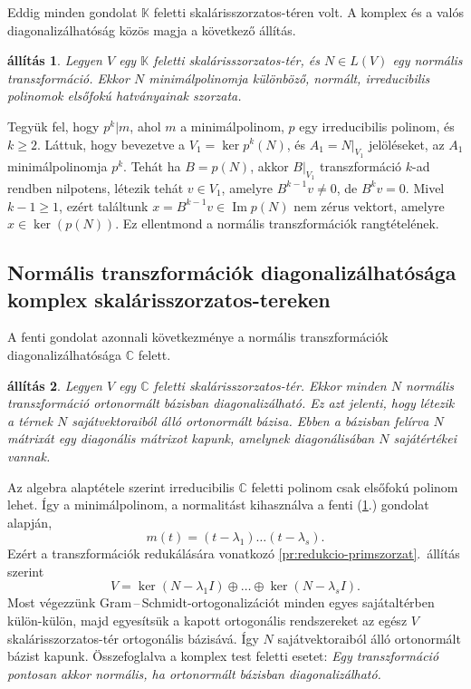 \documentclass[9pt, a4paper, showtrims]{memoir}
\makeatletter
\renewenvironment{proof}[1][\proofname]
    {\par\pushQED{\qed}%
    \normalfont \topsep6\p@\@plus6\p@\relax
    \trivlist
    \item[\hskip\labelsep
        \itshape
    #1\@addpunct{:}]\ignorespaces}
    {\popQED\endtrivlist\@endpefalse}
\theoremstyle{plain}
\newtheorem{proposition}{állítás}[chapter]
\theoremstyle{remark}
\theoremstyle{definition}
\DeclareMathOperator{\im}{Im}
\makeatother
\begin{document}
Eddig minden gondolat $\mathbb{K}$ feletti skalárisszorzatos-téren volt.
A komplex és a valós diagonalizálhatóság közös magja a következő állítás.
\begin{proposition}\label{pr:normalis-mult1}
	Legyen $V$ egy $\mathbb{K}$ feletti skalárisszorzatos-tér,
	és $N\in L\left( V \right)$ egy normális transzformáció.
	Ekkor $N$ minimálpolinomja különböző, normált, irreducibilis polinomok elsőfokú hatványainak szorzata.
\end{proposition}
\begin{proof}
	Tegyük fel, hogy $p^k|m$, ahol $m$ a minimálpolinom,
	$p$ egy irreducibilis polinom, és $k\geq 2.$
	Láttuk, hogy bevezetve a $V_1=\ker p^k\left( N \right)$, és
	$A_1=N|_{V_1}$ jelöléseket,
	az $A_1$ minimálpolinomja $p^k$.
	Tehát ha $B=p(N)$, akkor $B|_{V_1}$ transzformáció $k$-ad rendben nilpotens,
	létezik tehát $v\in V_1$,
	amelyre $B^{k-1}v\neq 0$,
	de $B^kv=0$.
	Mivel $k-1\geq 1$, ezért találtunk $x=B^{k-1}v\in\im p\left( N \right)$
	nem zérus vektort,
	amelyre $x\in\ker(p\left( N \right))$.
	Ez ellentmond a normális transzformációk rangtételének.
\end{proof}
\subsection{Normális transzformációk diagonalizálhatósága komplex skalárisszorzatos-tereken}
A fenti gondolat azonnali következménye a normális transzformációk diagonalizálhatósága $\mathbb{C}$ felett.
\begin{proposition}
	Legyen $V$ egy $\mathbb{C}$ feletti skalárisszorzatos-tér.
	Ekkor minden $N$ normális transzformáció ortonormált bázisban diagonalizálható.
	Ez azt jelenti, hogy létezik a térnek $N$ sajátvektoraiból álló ortonormált bázisa.
	Ebben a bázisban felírva $N$ mátrixát egy diagonális mátrixot kapunk,
	amelynek diagonálisában $N$ sajátértékei vannak.
\end{proposition}
\begin{proof}
	Az algebra alaptétele szerint irreducibilis $\mathbb{C}$ feletti polinom
	csak elsőfokú polinom lehet.
	Így a minimálpolinom, a normalitást kihasználva a fenti (\ref{pr:normalis-mult1}.) gondolat alapján,
	\[
		m\left( t \right)=\left( t-\lambda_1 \right)\dots\left( t-\lambda_s \right).
	\]
	Ezért a transzformációk redukálására vonatkozó \ref{pr:redukcio-primszorzat}.~állítás szerint
	\[
		V=\ker\left( N-\lambda_1I \right)\oplus\dots\oplus\ker\left( N-\lambda_sI \right).
	\]
	Most végezzünk Gram\,--\,Schmidt-ortogonalizációt
	minden egyes sajátaltérben külön-külön,
	majd egyesítsük a kapott ortogonális rendszereket az egész $V$ skalárisszorzatos-tér ortogonális bázisává.
	Így $N$ sajátvektoraiból álló ortonormált bázist kapunk.
\end{proof}
Összefoglalva a komplex test feletti esetet:
\emph{
	Egy transzformáció pontosan akkor normális,
	ha ortonormált bázisban diagonalizálható.
}
\end{document}

